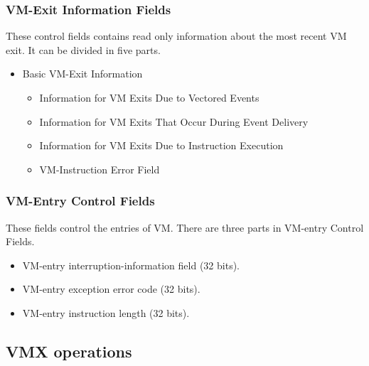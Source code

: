 \documentclass[onecolumn, draftclsnofoot,10pt, compsoc]{IEEEtran}
\begin{document}
    \subsubsection{VM-Exit Information Fields}
	These control fields contains read only information about the most recent VM exit. It can be divided in five parts.
    	\begin{itemize}
    				\item Basic VM-Exit Information
\begin{itemize}
	\item Information for VM Exits Due to Vectored Events
	\item Information for VM Exits That Occur During Event Delivery
	\item Information for VM Exits Due to Instruction Execution
	\item VM-Instruction Error Field
    \end{itemize}	\end{itemize}
    
    \subsubsection{VM-Entry Control Fields}
    These fields control the entries of VM. There are three parts in VM-entry Control Fields.
    
\begin{itemize}
  \item VM-entry interruption-information field (32 bits).
  \item VM-entry exception error code (32 bits). 
  \item VM-entry instruction length (32 bits).
\end{itemize}
   
  \subsection{VMX operations}
\end{document}
